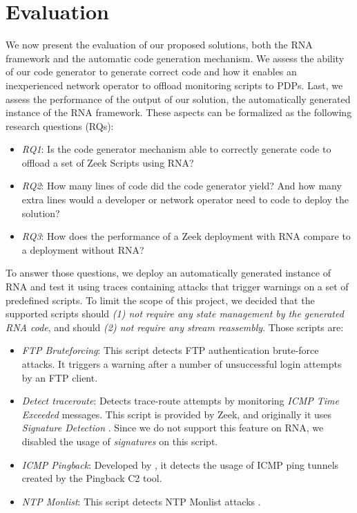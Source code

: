 
\section{Evaluation}
\label{sec:evaluation:evaluation}

We now present the evaluation of our proposed solutions, both the RNA framework and the automatic code generation mechanism. We assess the ability of our code generator to generate correct code and how it enables an inexperienced network operator to offload monitoring scripts to PDPs. Last, we assess the performance of the output of our solution, the automatically generated instance of the RNA framework. These aspects can be formalized as the following research questions (RQs):

\begin{itemize}
    \item \textit{RQ1}: Is the code generator mechanism able to correctly generate code to offload a set of Zeek Scripts using RNA?
    
    \item \textit{RQ2}: How many lines of code did the code generator yield? And how many extra lines would a developer or network operator need to code to deploy the solution?
    
    \item \textit{RQ3}: How does the performance of a Zeek deployment with RNA compare to a deployment without RNA?
\end{itemize}

To answer those questions, we deploy an automatically generated instance of RNA and test it using traces containing attacks that trigger warnings on a set of predefined scripts. To limit the scope of this project, we decided that the supported scripts should \textit{(1) not require any state management by the generated RNA code}, and should \textit{(2) not require any stream reassembly}. Those scripts are:

\begin{itemize}
    \item \textit{FTP Bruteforcing}: This script detects FTP authentication brute-force attacks. It triggers a warning after a number of unsuccessful login attempts by an FTP client.
    \item \textit{Detect traceroute}: Detects trace-route attempts by monitoring \textit{ICMP Time Exceeded} messages. This script is provided by Zeek, and originally it uses \textit{Signature Detection} \cite{ZeekSignatureFramework}. Since we do not support this feature on RNA, we disabled the usage of \textit{signatures} on this script.
    \item \textit{ICMP Pingback}: Developed by , it detects the usage of ICMP ping tunnels created by the Pingback C2 tool.
    \item \textit{NTP Monlist}: This script detects NTP Monlist attacks \cite{NtpMonlist}.
\end{itemize}


